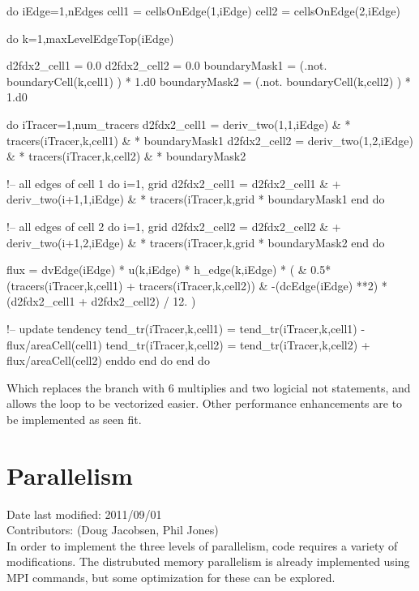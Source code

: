 \documentclass[11pt]{report}
\begin{document}
\begin{verbatimtab}
do iEdge=1,nEdges
  cell1 = cellsOnEdge(1,iEdge)
  cell2 = cellsOnEdge(2,iEdge)


  do k=1,maxLevelEdgeTop(iEdge)

    d2fdx2_cell1 = 0.0
    d2fdx2_cell2 = 0.0
    boundaryMask1 = (.not. boundaryCell(k,cell1) ) * 1.d0
    boundaryMask2 = (.not. boundaryCell(k,cell2) ) * 1.d0

    do iTracer=1,num_tracers
      d2fdx2_cell1 = deriv_two(1,1,iEdge) &
		  * tracers(iTracer,k,cell1)      &
		  * boundaryMask1
      d2fdx2_cell2 = deriv_two(1,2,iEdge) &
		  * tracers(iTracer,k,cell2)      &
		  * boundaryMask2

      !-- all edges of cell 1
      do i=1, grid %
        d2fdx2_cell1 = d2fdx2_cell1     &
               + deriv_two(i+1,1,iEdge) &
             * tracers(iTracer,k,grid %
             * boundaryMask1
      end do

      !-- all edges of cell 2
      do i=1, grid %
        d2fdx2_cell2 = d2fdx2_cell2     &
               + deriv_two(i+1,2,iEdge) &
             * tracers(iTracer,k,grid %
             * boundaryMask2
      end do

      flux = dvEdge(iEdge) *  u(k,iEdge) * h_edge(k,iEdge) * (          &
         0.5*(tracers(iTracer,k,cell1) + tracers(iTracer,k,cell2))      &
         -(dcEdge(iEdge) **2) * (d2fdx2_cell1 + d2fdx2_cell2) / 12. )

      !-- update tendency
      tend_tr(iTracer,k,cell1) = tend_tr(iTracer,k,cell1) - flux/areaCell(cell1)
      tend_tr(iTracer,k,cell2) = tend_tr(iTracer,k,cell2) + flux/areaCell(cell2)
    enddo
  end do
end do
\end{verbatimtab}

Which replaces the branch with 6 multiplies and two logicial not statements, and allows the loop to be vectorized easier. Other performance enhancements are to be implemented as seen fit.

\section{Parallelism}
Date last modified: 2011/09/01 \\
Contributors: (Doug Jacobsen, Phil Jones) \\

In order to implement the three levels of parallelism, code requires a variety of modifications. The distrubuted memory parallelism is already implemented using MPI commands, but some optimization for these can be explored. 
\end{document}
